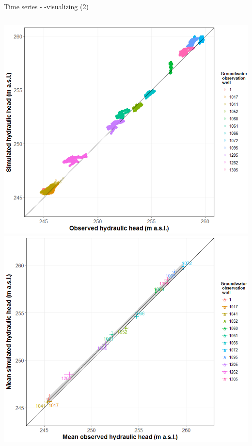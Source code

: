 \documentclass[9pt,ignorenonframetext,]{beamer}
\newcommand{\columnsbegin}{\begin{columns}}
\newcommand{\columnsend}{\end{columns}}
\begin{document}
\begin{frame}{Time series - -visualizing (2)}

\columnsbegin
{}
\includegraphics{imgPres/time_series_head_analysis02.png}
\includegraphics{imgPres/time_series_head_analysis03.png} \columnsend

\end{frame}
\end{document}
